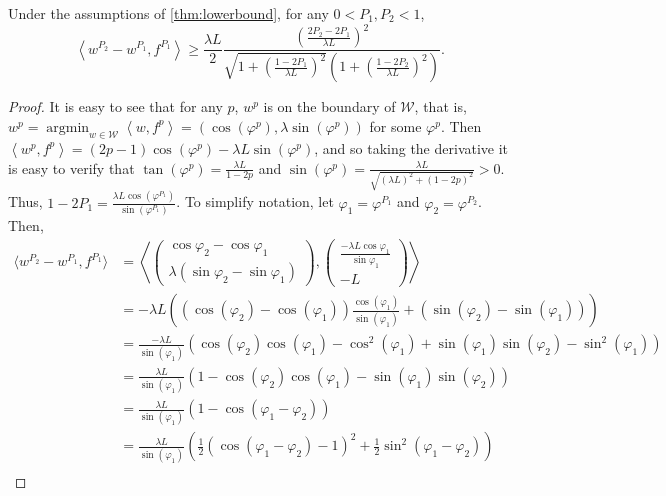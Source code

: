 \documentclass[english]{article}
\newcommand{\cW}{\mathcal{W}}
\newcommand{\inner}[1]{\left\langle#1\right\rangle}
\DeclareMathOperator*{\argmin}{argmin}
\begin{document}
\begin{lemma} Under the assumptions of \cref{thm:lowerbound}, for any $0<P_1,P_2<1$,
	\label{lem:P2P1loss}
	\[
	\inner{w^{P_2} - w^{P_1}, f^{P_1}} \ge \frac{\lambda L}{2} \frac{\left( \frac{2P_2 - 2P_1}{\lambda L} \right)^2}{\sqrt{1+\left( \frac{1-2P_1}{\lambda L}\right)^2 } \left(1+\left( \frac{1-2P_2}{\lambda L}\right)^2 \right)}.
	\]
\end{lemma}
\begin{proof}
	It is easy to see that for any $p$, $w^p$ is on the boundary of $\cW$, that is, $w^p = \argmin_{w\in\cW} \inner{ w, f^p } = (\cos (\varphi^p), \lambda\sin (\varphi^p))$ for some $\varphi^p$. 
	Then $\inner{w^p,f^p}= (2p-1) \cos (\varphi^p) - \lambda L \sin (\varphi^p)$, and so taking the derivative it is easy to verify that $\tan(\varphi^p) = \frac{\lambda L}{1-2p}$ and $\sin(\varphi^p) = \frac{\lambda L}{\sqrt{(\lambda L)^2+(1-2p)^2}} >0$. 
	Thus, $1-2P_1 = \frac{\lambda L\cos (\varphi^{P_1})}{\sin (\varphi^{P_1})}$. To simplify notation, let $\varphi_1=\varphi^{P_1}$ and $\varphi_2=\varphi^{P_2}$. Then,
	\begin{align}
	\langle w^{P_2} - w^{P_1}, f^{P_1} \rangle & = \left\langle \left(
	\begin{array}{c}
	\cos \varphi_{2} - \cos \varphi_{1} \\
	\lambda \left(\sin \varphi_{2} - \sin \varphi_{1} \right) 
	\end{array}
	\right),  \left( 
	\begin{array}{c}
	\frac{-\lambda L\cos \varphi_{1}}{\sin \varphi_{1}} \\
	-L
	\end{array}
	\right) \right\rangle \nonumber \\ 
	& = -\lambda L\left( \left( \cos (\varphi_{2}) - \cos (\varphi_{1} ) \right) \frac{\cos (\varphi_{1})}{\sin( \varphi_{1})} 
		 + \left(\sin (\varphi_{2}) - \sin (\varphi_{1} )\right)  \right)  \nonumber \\
	& = \frac{-\lambda L}{\sin( \varphi_{1})} \left( \cos (\varphi_{2} )\cos (\varphi_{1} )- \cos^2(\varphi_{1} )+ \sin (\varphi_{1}) \sin (\varphi_{2}) - \sin^2(\varphi_{1}) \right)  \nonumber \\
	& = \frac{\lambda L}{\sin (\varphi_{1})} \left( 1- \cos (\varphi_{2}) \cos (\varphi_{1})  - \sin (\varphi_{1}) \sin (\varphi_{2}) \right) \nonumber \\
	& = \frac{\lambda L}{\sin (\varphi_{1})} \left( 1- \cos(\varphi_{1}-\varphi_{2}) \right) \nonumber \\
	& = \frac{\lambda L}{\sin (\varphi_{1})} \left(\frac{1}{2}\left(\cos(\varphi_{1}-\varphi_{2})-1\right)^2 + \frac{1}{2} \sin^2 (\varphi_{1}-\varphi_{2})\right) \\

\end{align}
\end{proof}
\end{document}
